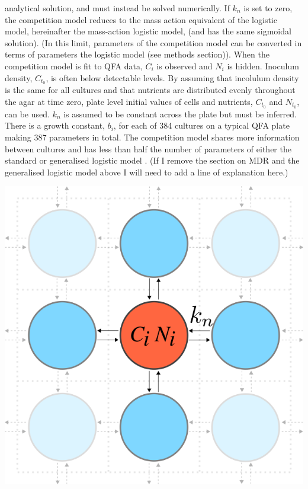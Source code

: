 analytical solution, and must instead be solved numerically. If
\(k_{n}\) is set to zero, the competition model reduces to the mass
action equivalent of the logistic model, hereinafter the mass-action
logistic model, (and has the same sigmoidal solution). (In this limit,
parameters of the competition model can be converted in terms of
parameters the logistic model (see methods section)).
When the competition model is fit to QFA data, \(C_{i}\) is observed
and \(N_{i}\) is hidden. Inoculum density, \(C_{t_{0}}\), is often
below detectable levels. By assuming that incolulum density is the
same for all cultures and that nutrients are distributed evenly
throughout the agar at time zero, plate level initial values of cells
and nutrients, \(C_{t_{0}}\) and \(N_{t_{0}}\), can be used. \(k_{n}\)
is assumed to be constant across the plate but must be inferred. There
is a growth constant, \(b_{i}\), for each of 384 cultures on a typical
QFA plate making 387 parameters in total. The competition model shares
more information between cultures and has less than half the number of
parameters of either the standard or generalised logistic model
\citep{Banks2012,qfa2016}. (If I remove the section on MDR and the
generalised logistic model above I will need to add a line of
explanation here.)
\begin{Figure}
  \centering
  \includegraphics[width=\linewidth]{comp_model/comp_model_schematic}
  \label{fig:comp_model_schematic}
\end{Figure}

